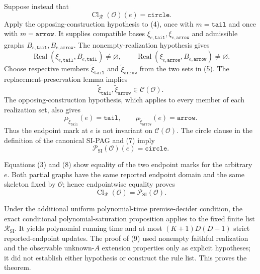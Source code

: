 Suppose instead that
\[
 \operatorname{Cl}_{\mathcal R}(\mathcal O)(e)=\mathtt{circle}.
\tag{4}
\]
Apply the opposing-construction hypothesis to (4), once with \(m=\mathtt{tail}\) and once with \(m=\mathtt{arrow}\). It supplies compatible bases \(\xi_{e,\mathtt{tail}},\xi_{e,\mathtt{arrow}}\) and admissible graphs \(B_{e,\mathtt{tail}},B_{e,\mathtt{arrow}}\). The nonempty-realization hypothesis gives
\[
 \operatorname{Real}(\xi_{e,\mathtt{tail}},B_{e,\mathtt{tail}})\ne\varnothing,
 \qquad
 \operatorname{Real}(\xi_{e,\mathtt{arrow}},B_{e,\mathtt{arrow}})\ne\varnothing.
\tag{5}
\]
Choose respective members \(\widetilde\xi_{\mathtt{tail}}\) and \(\widetilde\xi_{\mathtt{arrow}}\) from the two sets in (5). The replacement-preservation lemma implies
\[
 \widetilde\xi_{\mathtt{tail}},\widetilde\xi_{\mathtt{arrow}}
 \in\mathcal C(\mathcal O).
\tag{6}
\]
The opposing-construction hypothesis, which applies to every member of each realization set, also gives
\[
 \mu_{\widetilde\xi_{\mathtt{tail}}}(e)=\mathtt{tail},
 \qquad
 \mu_{\widetilde\xi_{\mathtt{arrow}}}(e)=\mathtt{arrow}.
\tag{7}
\]
Thus the endpoint mark at \(e\) is not invariant on \(\mathcal C(\mathcal O)\). The circle clause in the definition of the canonical SI-PAG and (7) imply
\[
 \mathcal P_{\mathrm{SI}}(\mathcal O)(e)=\mathtt{circle}.
\tag{8}
\]

Equations (3) and (8) show equality of the two endpoint marks for the arbitrary \(e\). Both partial graphs have the same reported endpoint domain and the same skeleton fixed by \(\mathcal O\); hence endpointwise equality proves
\[
 \operatorname{Cl}_{\mathcal R}(\mathcal O)
 =\mathcal P_{\mathrm{SI}}(\mathcal O).
\tag{9}
\]

Under the additional uniform polynomial-time premise-decider condition, the exact conditional polynomial-saturation proposition applies to the fixed finite list \(\mathcal R_{\mathrm{SI}}\). It yields polynomial running time and at most \((K+1)D(D-1)\) strict reported-endpoint updates. The proof of (9) used nonempty faithful realization and the observable unknown-\(A\) extension properties only as explicit hypotheses; it did not establish either hypothesis or construct the rule list. This proves the theorem.
